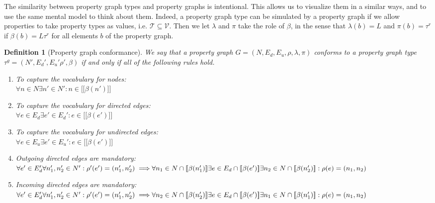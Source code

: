 \documentclass[a4paper]{article}
\newtheorem{definition}[theorem]{Definition}
\newcommand{\ptypes}{\mathcal{T}}
\newcommand{\rtype}{\tau^r}
\newcommand{\gtype}{\tau^g}
\newcommand{\lsem}{\ensuremath{[\![}}
\newcommand{\rsem}{\ensuremath{]\!]}}
\newcommand{\sem}[1]{\ensuremath{\lsem #1 \rsem}}
\begin{document}
The similarity between property graph types and property graphs is intentional. This allows us to visualize them in a similar ways, and to use the same mental model to think about them. Indeed, a property graph type can be simulated by a property graph if we allow properties to take property types as values, i.e. $\ptypes \subseteq \mathcal{V}$. Then we let $\lambda$ and $\pi$ take the role of $\beta$, in the sense that $\lambda(b) = L$ and $\pi(b) = \rtype$ if $\beta(b) = L\rtype$ for all elements $b$ of the property graph.

\begin{definition}[Property graph conformance]
  We say that a property graph $G = (N, E_d, E_u, \rho, \lambda, \pi)$ \emph{conforms} to a property graph type $\gtype = (N', E_d', E_u' \rho', \beta)$ if and only if all of the following rules hold.

  \begin{enumerate}
    \item To capture the vocabulary for nodes:\\
    $\forall n \in N \exists n' \in N' : n \in \sem{\beta(n')}$
    
    \item To capture the vocabulary for directed edges:\\
    $\forall e \in E_d \exists e' \in E_d' : e \in \sem{\beta(e')}$

    \item To capture the vocabulary for undirected edges:\\
    $\forall e \in E_u \exists e' \in E_u' : e \in \sem{\beta(e')}$
    
    \item Outgoing directed edges are mandatory:\\
    $\forall e' \in E_d' \forall n'_1, n'_2 \in N' : \rho'(e') = (n'_1, n'_2) \implies
    \\\forall n_1 \in N \cap \sem{\beta(n'_1)} \exists e \in E_d \cap \sem{\beta(e')} \exists n_2 \in N \cap \sem{\beta(n'_2)} : \rho(e) = (n_1, n_2)$

    \item Incoming directed edges are mandatory:\\
    $\forall e' \in E_d' \forall n'_1, n'_2 \in N' : \rho'(e') = (n'_1, n'_2) \implies
    \\\forall n_2 \in N \cap \sem{\beta(n'_2)} \exists e \in E_d \cap \sem{\beta(e')} \exists n_1 \in N \cap \sem{\beta(n'_1)} : \rho(e) = (n_1, n_2)$
    

\end{enumerate}
\end{definition}
\end{document}
